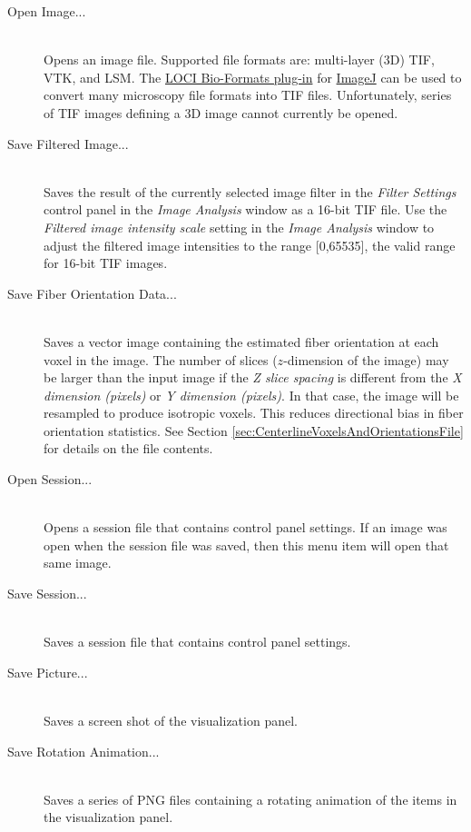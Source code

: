\documentclass[11pt,titlepage,twoside]{article}
\begin{document}
\begin{description}
  \item[Open Image...] \hfill \\
   Opens an image file. Supported file formats are: multi-layer (3D) TIF, VTK, and LSM. The \href{http://www.loci.wisc.edu/bio-formats/imagej}{LOCI Bio-Formats plug-in}  for \href{http://rsbweb.nih.gov/ij/}{ImageJ} can be used to convert many microscopy file formats into TIF files. Unfortunately, series of TIF images defining a 3D image cannot currently be opened.

  \item[Save Filtered Image...] \hfill \\
  Saves the result of the currently selected image filter in the \emph{Filter Settings} control   panel in the \emph{Image Analysis} window as a 16-bit TIF file.  Use the \emph{Filtered image intensity scale} setting in the \emph{Image Analysis} window to adjust the filtered image intensities to the range [0,65535], the valid range for 16-bit TIF images.

  \item[Save Fiber Orientation Data...] \hfill \\
   Saves a vector image containing the estimated fiber orientation at each voxel in the image. The number of slices ($z$-dimension of the image) may be larger than the input image if the \emph{Z slice spacing} is different from the \emph{X dimension (pixels)} or \emph{Y dimension (pixels)}. In that case, the image will be resampled to produce isotropic voxels. This reduces directional bias in fiber orientation statistics. See Section \ref{sec:CenterlineVoxelsAndOrientationsFile} for details on the file contents.
   
  \item[Open Session...] \hfill \\
  Opens a session file that contains control panel settings. If an image was open when the session file was saved, then this menu item will open that same image.
  
  \item[Save Session...] \hfill \\
  Saves a session file that contains control panel settings.
  
  \item[Save Picture...] \hfill \\
  Saves a screen shot of the visualization panel.
  
  \item[Save Rotation Animation...] \hfill \\
  Saves a series of PNG files containing a rotating animation of the items in the visualization panel.
  

\end{description}
\end{document}
